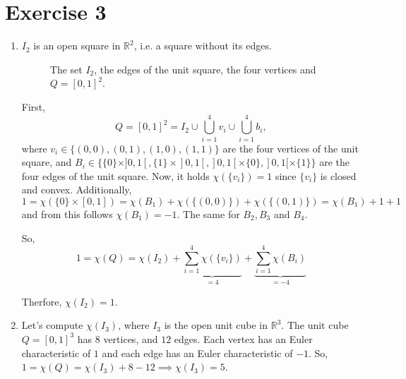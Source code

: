 \documentclass{article}
\begin{document}
\section*{Exercise 3}
\begin{enumerate}
    \item $I_2$ is an open square in $\mathbb R^2$, i.e. a square without its edges.
    \begin{figure}[htbp]
        \centering
        \caption{The set $I_2$, the edges of the unit square, the four vertices and $Q=[0,1]^2$.}
    \end{figure}

    First, 
    $$
        Q = [0,1]^2 = I_2 \cup \bigcup_{i=1}^4 v_i \cup \bigcup^4_{i=1} b_i,
    $$ 
    where $v_i \in \{ (0,0),(0,1),(1,0),(1,1) \}$ are the four vertices of the unit square, and $B_i \in \{\{0\} \times ]0,1[, \{1\} \times ]0,1[, ]0,1[ \times \{0\}, ]0,1[ \times \{1\} \}$ are the four edges of the unit square. Now, it holds $\chi(\{v_i\}) = 1$ since $\{v_i\}$ is closed and convex. Additionally, 
    $$
        1 = \chi(\{0\} \times [0,1]) = \chi(B_1) + \chi(\{(0,0)\}) + \chi(\{(0,1)\}) = \chi(B_1) + 1 + 1
    $$ 
    and from this follows $\chi(B_1) = -1$. The same for $B_2, B_3$ and $B_4$.

    So, 
    $$
        1 = \chi(Q) = \chi(I_2) + \underbrace{\sum^4_{i=1}\chi(\{v_i\})}_{=4} + \underbrace{\sum^4_{i=1}\chi(B_i)}_{=-4} 
    $$

    Therfore, $\chi(I_2) = 1$.

    \item Let's compute $\chi(I_3)$, where $I_3$ is the open unit cube in $\mathbb R^3$. The unit cube $Q = [0,1]^3$ has $8$ vertices, and $12$ edges. Each vertex has an Euler characteristic of $1$ and each edge has an Euler characteristic of $-1$. So, $1=\chi(Q) = \chi(I_3) + 8 - 12 \implies \chi(I_3) = 5$.
\end{enumerate}
\end{document}
